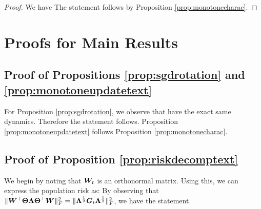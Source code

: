 \begin{proof}
We have
The statement follows by  Proposition \ref{prop:monotonecharac}.
\end{proof}
 
 
 
 
 






\section{Proofs for Main Results}
\label{sec:mainproofs}
\subsection{Proof of Propositions \ref{prop:sgdrotation} and \ref{prop:monotoneupdatetext}}
For Proposition \ref{prop:sgdrotation}, we observe that
have the exact same dynamics. Therefore the statement follows. Proposition \ref{prop:monotoneupdatetext} follows Proposition \ref{prop:monotonecharac}. 

\subsection{Proof of Proposition \ref{prop:riskdecomptext}}
We begin by noting that $\boldsymbol{W}_t$ is an orthonormal matrix. Using this, we can express the population risk as:
By observing that  $\lVert \boldsymbol{W}^\top \boldsymbol{\Theta} \boldsymbol{\Lambda} \boldsymbol{\Theta}^\top \boldsymbol{W}\rVert_F^2 = \lVert\boldsymbol{\Lambda}^{\frac{1}{2}} \boldsymbol{G}_t \boldsymbol{\Lambda}^{\frac{1}{2}}\rVert_F^2$, we have the statement.  


